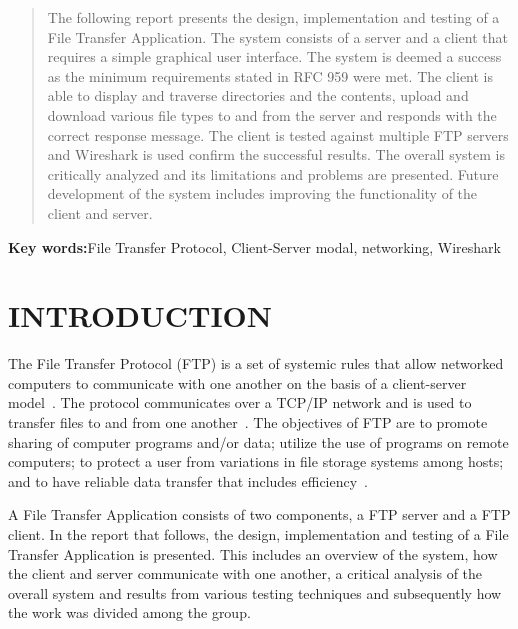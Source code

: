 \documentclass[10pt, conference]{IEEEtran}
\begin{document}
\begin{titlepage}
 
\begin{abstract}
The following report presents the design, implementation and testing of a File Transfer Application. The system consists of a server and a client that requires a simple graphical user interface. The system is deemed a success as the minimum requirements stated in RFC 959 were met. The client is able to display and traverse directories and the contents, upload and download various file types to and from the server and responds with the correct response message. The client is tested against multiple FTP servers and Wireshark is used confirm the successful results. The overall system is critically analyzed and its limitations and problems are presented. Future development of the system includes improving the functionality of the client and server.
\end{abstract}
\textbf{Key words:}File Transfer Protocol, Client-Server modal, networking, Wireshark

\vfill %

\end{titlepage}

\section{INTRODUCTION}
\label{sec: Introduction}
The File Transfer Protocol (FTP) is a set of systemic rules that allow networked computers to communicate with one another on the basis of a client-server model~\cite{FTP}. The protocol communicates over a TCP/IP network and is used to transfer files to and from one another~\cite{WIRED}. The objectives of FTP are to promote sharing of computer programs and/or data; utilize the use of programs on remote computers; to protect a user from variations in file storage systems among hosts; and to have reliable data transfer that includes efficiency~\cite{RFC959}.

A File Transfer Application consists of two components, a FTP server and a FTP client. In the report that follows, the design, implementation and testing of a File Transfer Application is presented. This includes an overview of the system, how the client and server communicate with one another, a critical analysis of the overall system and results from various testing techniques and subsequently how the work was divided among the group.
\end{document}
